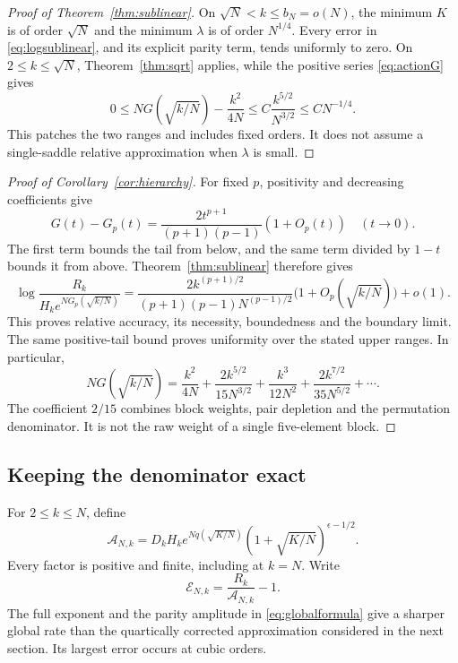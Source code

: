 \documentclass[11pt]{article}
\theoremstyle{definition}
\theoremstyle{remark}
\newcommand{\1}{\mathbf 1}
\begin{document}
\begin{proof}[Proof of Theorem~\ref{thm:sublinear}]
On $\sqrt N<k\le b_N=o(N)$, the minimum $K$ is of order $\sqrt N$ and the minimum $\lambda$ is of order $N^{1/4}$. Every error in \eqref{eq:logsublinear}, and its explicit parity term, tends uniformly to zero. On $2\le k\le\sqrt N$, Theorem~\ref{thm:sqrt} applies, while the positive series \eqref{eq:actionG} gives
\[
0\le NG(\sqrt{k/N})-\frac{k^2}{4N}
\le C\frac{k^{5/2}}{N^{3/2}}\le CN^{-1/4}.
\]
This patches the two ranges and includes fixed orders. It does not assume a single-saddle relative approximation when $\lambda$ is small.
\end{proof}

\begin{proof}[Proof of Corollary~\ref{cor:hierarchy}]
For fixed $p$, positivity and decreasing coefficients give
\[
G(t)-G_p(t)=\frac{2t^{p+1}}{(p+1)(p-1)}(1+O_p(t))
\quad(t\to0).
\]
The first term bounds the tail from below, and the same term divided by $1-t$ bounds it from above. Theorem~\ref{thm:sublinear} therefore gives
\[
\log\frac{R_k}{H_ke^{NG_p(\sqrt{k/N})}}
=\frac{2k^{(p+1)/2}}{(p+1)(p-1)N^{(p-1)/2}}
\bigl(1+O_p(\sqrt{k/N})\bigr)+o(1).
\]
This proves relative accuracy, its necessity, boundedness and the boundary limit. The same positive-tail bound proves uniformity over the stated upper ranges. In particular,
\[
NG(\sqrt{k/N})
=\frac{k^2}{4N}+\frac{2k^{5/2}}{15N^{3/2}}
+\frac{k^3}{12N^2}+\frac{2k^{7/2}}{35N^{5/2}}+\cdots.
\]
The coefficient $2/15$ combines block weights, pair depletion and the permutation denominator. It is not the raw weight of a single five-element block.
\end{proof}

\subsection{Keeping the denominator exact}

For $2\le k\le N$, define
\begin{equation}\label{eq:globalformula}
\mathcal A_{N,k}
=D_kH_k e^{Nq(\sqrt{K/N})}
(1+\sqrt{K/N})^{\epsilon-1/2}.
\end{equation}
Every factor is positive and finite, including at $k=N$. Write
\[
\mathcal E_{N,k}=\frac{R_k}{\mathcal A_{N,k}}-1.
\]
The full exponent and the parity amplitude in \eqref{eq:globalformula} give a sharper global rate than the quartically corrected approximation considered in the next section. Its largest error occurs at cubic orders.
\end{document}
